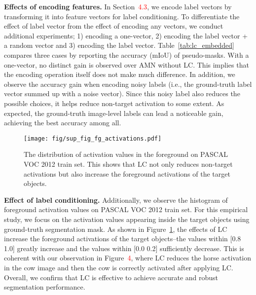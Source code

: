 \documentclass[10pt,twocolumn,letterpaper]{article}
\begin{document}
\noindent \textbf{Effects of encoding features.} In Section~\textcolor{red}{4.3}, we encode label vectors by transforming it into feature vectors for label conditioning. To differentiate the effect of label vector from the effect of encoding any vectors, we conduct additional experiments; 1) encoding a one-vector, 2) encoding the label vector + a random vector and 3) encoding the label vector. Table~\ref{tab:lc_embedded} compares three cases by reporting the accuracy (mIoU) of pseudo-masks. With a one-vector, no distinct gain is observed over AMN without LC. This implies that the encoding operation itself does not make much difference. In addition, we observe the accuracy gain when encoding noisy labels (i.e., the ground-truth label vector summed up with a noise vector). Since this noisy label also reduces the possible choices, it helps reduce non-target activation to some extent. As expected, the ground-truth image-level labels can lead a noticeable gain, achieving the best accuracy among all.  

\begin{table}
\caption{
Accuracy (mIoU) of pseudo-masks from AMN without the boundary refinement on PASCAL VOC 2012 train set. The accuracy depends on the information encoded through the label conditioning module.
}
\label{tab:lc_embedded}
\end{table} 
\begin{figure}[t]
\centering
\texttt{[image: fig/sup\_fig\_fg\_activations.pdf]}
\vspace{-1mm}
\caption{The distribution of activation values in the foreground on PASCAL VOC 2012 train set. This shows that LC not only reduces non-target activations but also increase the foreground activations of the target objects.}
\label{fig:sup_fg_activations}
\vspace{-5mm}
\end{figure} 
\noindent \textbf{Effect of label conditioning.} Additionally, we observe the histogram of foreground activation values on PASCAL VOC 2012 train set. For this empirical study, we focus on the activation values appearing inside the target objects using ground-truth segmentation mask. As shown in Figure~\ref{fig:sup_fg_activations}, the effects of LC increase the foreground activations of the target objects--the values within [0.8 1.0] greatly increase and the values within [0.0 0.2] sufficiently decrease. This is coherent with our observation in Figure~\textcolor{red}{4}, where LC reduces the horse activation in the cow image and then the cow is correctly activated after applying LC. Overall, we confirm that LC is effective to achieve accurate and robust segmentation performance.
\end{document}
